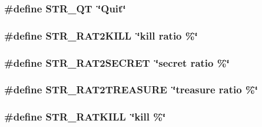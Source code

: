 \hypertarget{FOREIGN_8H_ad23128b2b5dc8060ae1e0d9d4a8a3feb}{
\subsubsection[{STR\_\-QT}]{\setlength{\rightskip}{0pt plus 5cm}\#define STR\_\-QT~\char`\"{}Quit\char`\"{}}}
\label{FOREIGN_8H_ad23128b2b5dc8060ae1e0d9d4a8a3feb}
\hypertarget{FOREIGN_8H_aa1bc8012c4713512e14ad90687d0403b}{
\subsubsection[{STR\_\-RAT2KILL}]{\setlength{\rightskip}{0pt plus 5cm}\#define STR\_\-RAT2KILL~\char`\"{}kill ratio    \%\char`\"{}}}
\label{FOREIGN_8H_aa1bc8012c4713512e14ad90687d0403b}
\hypertarget{FOREIGN_8H_af4d415506bff12e2c557cee0ae82073e}{
\subsubsection[{STR\_\-RAT2SECRET}]{\setlength{\rightskip}{0pt plus 5cm}\#define STR\_\-RAT2SECRET~\char`\"{}secret ratio    \%\char`\"{}}}
\label{FOREIGN_8H_af4d415506bff12e2c557cee0ae82073e}
\hypertarget{FOREIGN_8H_aa2919e6a6af42cb4961631cf10e5a1b1}{
\subsubsection[{STR\_\-RAT2TREASURE}]{\setlength{\rightskip}{0pt plus 5cm}\#define STR\_\-RAT2TREASURE~\char`\"{}treasure ratio    \%\char`\"{}}}
\label{FOREIGN_8H_aa2919e6a6af42cb4961631cf10e5a1b1}
\hypertarget{FOREIGN_8H_aa8b68eb407b2fd48b234f989d8e435ee}{
\subsubsection[{STR\_\-RATKILL}]{\setlength{\rightskip}{0pt plus 5cm}\#define STR\_\-RATKILL~\char`\"{}kill    \%\char`\"{}}}
